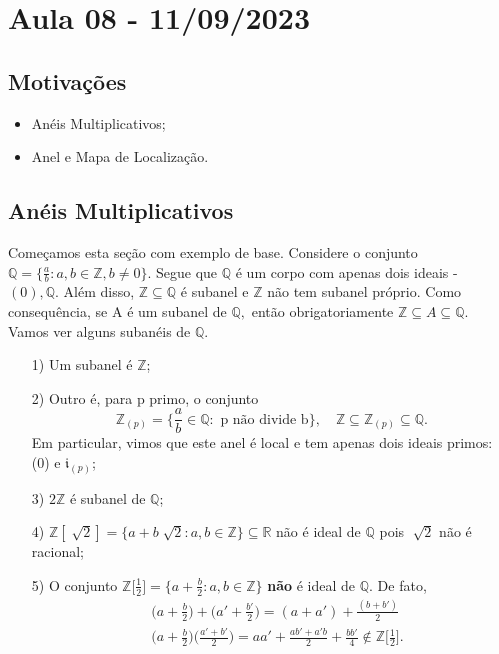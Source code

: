 \documentclass[AlgebraII/algebraII_notes.tex]{subfiles}
\begin{document}
\section{Aula 08 - 11/09/2023}
\subsection{Motivações}
\begin{itemize}
	\item Anéis Multiplicativos;
	\item Anel e Mapa de Localização.
\end{itemize}
\subsection{Anéis Multiplicativos}
Começamos esta seção com exemplo de base. Considere o conjunto \(\mathbb{Q}=\biggl\{\frac{a}{b}: a, b\in \mathbb{Z}, b\neq 0\biggr\}.\)
Segue que \(\mathbb{Q}\) é um corpo com apenas dois ideais - \((0), \mathbb{Q}.\) Além disso,
\(\mathbb{Z}\subseteq \mathbb{Q}\) é subanel e \(\mathbb{Z}\) não tem subanel próprio. Como consequência, se
A é um subanel de \(\mathbb{Q},\) então obrigatoriamente \(\mathbb{Z}\subseteq A\subseteq \mathbb{Q}\). Vamos ver alguns subanéis de \(\mathbb{Q}.\)
\begin{example}
	\begin{itemize}
		\item[1)] Um subanel é \(\mathbb{Z}\);
		\item[2)] Outro é, para p primo, o conjunto
		      \[
			      \mathbb{Z}_{(p)} = \biggl\{\frac{a}{b}\in \mathbb{Q}:\text{ p não divide b}\biggr\},\quad \mathbb{Z}\subseteq \mathbb{Z}_{(p)}\subseteq \mathbb{Q}.
		      \]
		      Em particular, vimos que este anel é local e tem apenas dois ideais primos: (0) e \(\mathfrak{i}_{(p)}\);
		\item[3)] \(2\mathbb{Z}\) é subanel de \(\mathbb{Q}\);
		\item[4)] \(\mathbb{Z}[\sqrt[]{2}]=\{a + b\sqrt[]{2}: a, b\in \mathbb{Z}\}\subseteq \mathbb{R}\) não é ideal de \(\mathbb{Q}\) pois \(\sqrt[]{2}\) não é racional;
		\item[5)] O conjunto \(\mathbb{Z}\biggl[\frac{1}{2}\biggr]=\biggl\{a + \frac{b}{2}: a, b\in \mathbb{Z}\biggr\}\) \textbf{não} é ideal de \(\mathbb{Q}\). De fato,
		      \begin{align*}
			       & \biggl(a+\frac{b}{2}\biggr)+\biggl(a'+\frac{b'}{2}\biggr) = (a+a') + \frac{(b+b')}{2}                                                          \\
			       & \biggl(a+\frac{b}{2}\biggr)\biggl(\frac{a'+b'}{2}\biggr) = aa' + \frac{ab'+a'b}{2} + \frac{bb'}{4}\not\in \mathbb{Z}\biggl[\frac{1}{2}\biggr].
		      \end{align*}
	\end{itemize}
\end{example}
\end{document}

